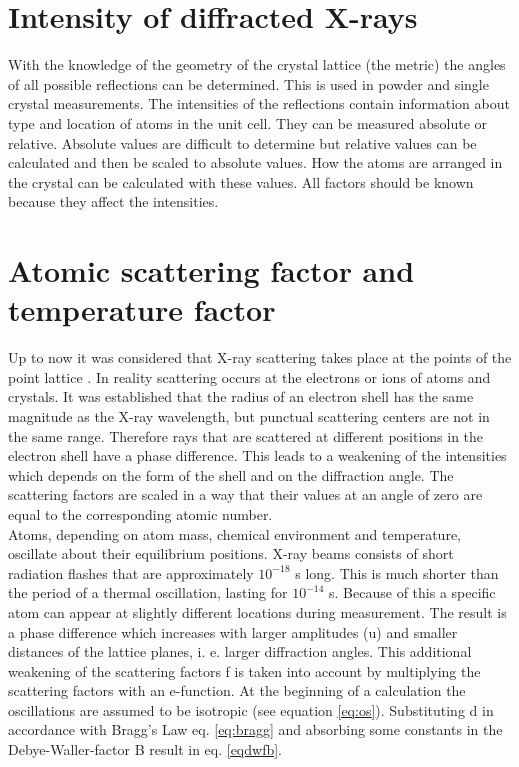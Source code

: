 \section{Intensity of diffracted X-rays}
With the knowledge of the geometry of the crystal lattice (the metric) the angles of all possible reflections can be determined. This is used in powder and single crystal measurements. The intensities of the reflections contain information about type and location of atoms in the unit cell. They can be measured absolute or relative. Absolute values are difficult to determine but relative values can be calculated and then be scaled to absolute values. How the atoms are arranged in the crystal can be calculated with these values. All factors should be known because they affect the intensities.

\section{Atomic scattering factor and temperature factor}
Up to now it was considered that X-ray scattering takes place at the points of the point lattice . In reality scattering occurs at the electrons or ions of atoms and crystals.  It was established that the radius of an electron shell has the same magnitude as the X-ray wavelength, but punctual scattering centers are not in the same range. Therefore  rays that are scattered at different positions in the electron shell have a phase difference. This leads to a weakening of the intensities which depends on the form of the shell and on the diffraction angle.  The scattering factors are scaled in a way that their values at an angle of zero are equal to the corresponding atomic number. \\
Atoms, depending on atom mass, chemical environment and temperature, oscillate about their equilibrium positions. X-ray beams consists of short radiation flashes that are approximately $10^{-18}$ s long. This is much shorter than the period of a thermal oscillation, lasting for $10^{-14}$ s. Because of this a specific atom can appear at slightly different locations during measurement. The result is a phase difference which increases with larger amplitudes (u) and smaller distances of the lattice planes, i. e. larger diffraction angles. This additional weakening of the scattering factors f is taken into account by multiplying the scattering factors with an e-function. At the beginning of a calculation the oscillations are assumed to be isotropic (see equation \ref{eq:os}). Substituting d in accordance with Bragg's Law eq. \ref{eq:bragg} and absorbing some constants in the Debye-Waller-factor B \cite{debye}\cite{waller} result in eq. \ref{eqdwfb}.


